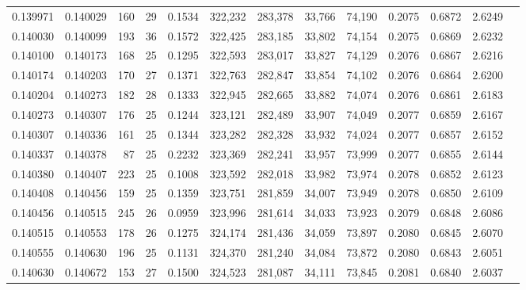 \begin{tabular}{rrrrrrrrrrrrr}
0.139971 & 0.140029 & 160 &  29 &                                     0.1534 & 322,232 & 283,378 &  33,766 &  74,190 & 0.2075 & 0.6872 & 2.6249 \\
0.140030 & 0.140099 & 193 &  36 &                                     0.1572 & 322,425 & 283,185 &  33,802 &  74,154 & 0.2075 & 0.6869 & 2.6232 \\
0.140100 & 0.140173 & 168 &  25 &                                     0.1295 & 322,593 & 283,017 &  33,827 &  74,129 & 0.2076 & 0.6867 & 2.6216 \\
0.140174 & 0.140203 & 170 &  27 &                                     0.1371 & 322,763 & 282,847 &  33,854 &  74,102 & 0.2076 & 0.6864 & 2.6200 \\
0.140204 & 0.140273 & 182 &  28 &                                     0.1333 & 322,945 & 282,665 &  33,882 &  74,074 & 0.2076 & 0.6861 & 2.6183 \\
0.140273 & 0.140307 & 176 &  25 &                                     0.1244 & 323,121 & 282,489 &  33,907 &  74,049 & 0.2077 & 0.6859 & 2.6167 \\
0.140307 & 0.140336 & 161 &  25 &                                     0.1344 & 323,282 & 282,328 &  33,932 &  74,024 & 0.2077 & 0.6857 & 2.6152 \\
0.140337 & 0.140378 &  87 &  25 &                                     0.2232 & 323,369 & 282,241 &  33,957 &  73,999 & 0.2077 & 0.6855 & 2.6144 \\
0.140380 & 0.140407 & 223 &  25 &                                     0.1008 & 323,592 & 282,018 &  33,982 &  73,974 & 0.2078 & 0.6852 & 2.6123 \\
0.140408 & 0.140456 & 159 &  25 &                                     0.1359 & 323,751 & 281,859 &  34,007 &  73,949 & 0.2078 & 0.6850 & 2.6109 \\
0.140456 & 0.140515 & 245 &  26 &                                     0.0959 & 323,996 & 281,614 &  34,033 &  73,923 & 0.2079 & 0.6848 & 2.6086 \\
0.140515 & 0.140553 & 178 &  26 &                                     0.1275 & 324,174 & 281,436 &  34,059 &  73,897 & 0.2080 & 0.6845 & 2.6070 \\
0.140555 & 0.140630 & 196 &  25 &                                     0.1131 & 324,370 & 281,240 &  34,084 &  73,872 & 0.2080 & 0.6843 & 2.6051 \\
0.140630 & 0.140672 & 153 &  27 &                                     0.1500 & 324,523 & 281,087 &  34,111 &  73,845 & 0.2081 & 0.6840 & 2.6037 \\

\end{tabular}
